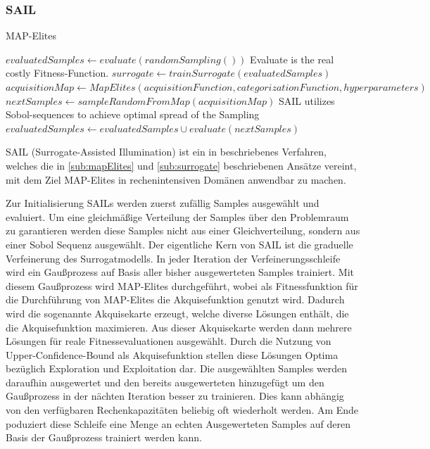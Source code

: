 \subsubsection{SAIL}

\begin{algorithm}
	\caption{MAP-Elites} \label{alg:mapElites}
	\begin{algorithmic}[1]
\State $evaluatedSamples \gets evaluate(randomSampling())$ \Comment Evaluate is the real costly Fitness-Function.
\Else
\State $surrogate \gets trainSurrogate(evaluatedSamples)$
\State $acquisitionMap \gets MapElites(acquisitionFunction,categorizationFunction,hyperparameters)$
\State $nextSamples \gets sampleRandomFromMap(acquisitionMap)$ \Comment SAIL utilizes Sobol-sequences to achieve optimal spread of the Sampling
\State $evaluatedSamples \gets evaluatedSamples \cup evaluate(nextSamples)$
\EndIf
			\EndWhile
		\EndProcedure
	\end{algorithmic}
\end{algorithm}


SAIL (Surrogate-Assisted Illumination) ist ein in \cite{Gaier.6152018} beschriebenes Verfahren, welches die in \ref{sub:mapElites} und \ref{sub:surrogate} beschriebenen Ansätze vereint, mit dem Ziel MAP-Elites in rechenintensiven Domänen anwendbar zu machen.

Zur Initialisierung SAILs werden zuerst zufällig Samples ausgewählt und evaluiert.
Um eine gleichmäßige Verteilung der Samples über den Problemraum zu garantieren werden diese Samples nicht aus einer Gleichverteilung, sondern aus einer Sobol Sequenz ausgewählt.
Der eigentliche Kern von SAIL ist die graduelle Verfeinerung des Surrogatmodells.
In jeder Iteration der Verfeinerungsschleife wird ein Gaußprozess auf Basis aller bisher ausgewerteten Samples trainiert.
Mit diesem Gaußprozess wird MAP-Elites durchgeführt, wobei als Fitnessfunktion für die Durchführung von MAP-Elites die Akquisefunktion genutzt wird.
Dadurch wird die sogenannte Akquisekarte erzeugt, welche diverse Lösungen enthält, die die Akquisefunktion maximieren.
Aus dieser Akquisekarte werden dann mehrere Lösungen für reale Fitnessevaluationen ausgewählt.
Durch die Nutzung von Upper-Confidence-Bound als Akquisefunktion stellen diese Lösungen Optima bezüglich Exploration und Exploitation dar.
Die ausgewählten Samples werden daraufhin ausgewertet  und den bereits ausgewerteten hinzugefügt um den Gaußprozess in der nächten Iteration besser zu trainieren.
Dies kann abhängig von den verfügbaren Rechenkapazitäten beliebig oft wiederholt werden.
Am Ende poduziert diese Schleife eine Menge an echten Ausgewerteten Samples auf deren Basis der Gaußprozess trainiert werden kann.

